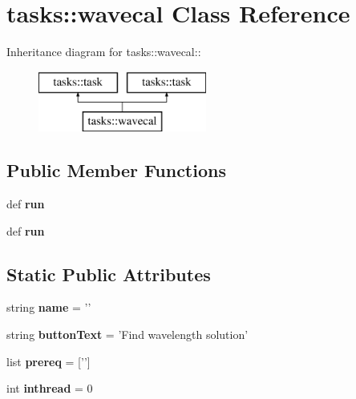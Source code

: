 \section{tasks::wavecal Class Reference}
\label{classtasks_1_1wavecal}
Inheritance diagram for tasks::wavecal::\begin{figure}[H]
\begin{center}
\leavevmode
\includegraphics[height=2cm]{classtasks_1_1wavecal}
\end{center}
\end{figure}
\subsection*{Public Member Functions}
\begin{CompactItemize}
\item 
def \textbf{run}\label{classtasks_1_1wavecal_f6be9eb15626e914a716d2cea7dd733a}

\item 
def \textbf{run}\label{classtasks_1_1wavecal_f6be9eb15626e914a716d2cea7dd733a}

\end{CompactItemize}
\subsection*{Static Public Attributes}
\begin{CompactItemize}
\item 
string \textbf{name} = '{\bfwavecal}'\label{classtasks_1_1wavecal_662466b5dca4887cf29a1544ff540e4e}

\item 
string \textbf{button\-Text} = 'Find wavelength solution'\label{classtasks_1_1wavecal_8d305b5a22837dda6b63b083284d3403}

\item 
list \textbf{prereq} = ['{\bffindord}']\label{classtasks_1_1wavecal_00ba057428243ec2132a86836fe0ad1b}

\item 
int \textbf{inthread} = 0\label{classtasks_1_1wavecal_be011617a0ed60b4abde6e02f292027a}

\end{CompactItemize}


